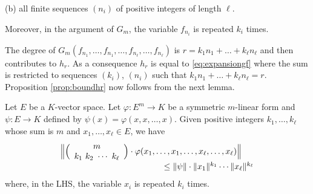 \documentclass{sig-alternate-2013}
\def\binom#1#2{\Big(\begin{array}{cc} #1 \\ #2 \end{array}\Big)}
\begin{document}
\noindent
(b) all finite sequences $(n_i)$ of positive integers of length
$\ell$.

\noindent
Moreover, in the argument of $G_m$, the variable $f_{n_i}$ 
is repeated $k_i$ times.

The degree of $G_m(f_{n_1}, \ldots, f_{n_1}, \ldots, f_{n_\ell},
\ldots, f_{n_\ell})$ is $r = k_1 n_1 + \ldots + k_\ell n_\ell$ and 
then contributes to $h_r$. As a consequence $h_r$ is equal to 
\eqref{eq:expansiongf} where the sum is restricted to sequences
$(k_i)$, $(n_i)$ such that $k_1 n_1 + \ldots + k_\ell n_\ell = r$.
Proposition \ref{prop:boundhr} now follows from the next lemma.

\begin{lem}
Let $E$ be a $K$-vector space. Let $\varphi : E^m \to 
K$ be a symmetric $m$-linear form and $\psi: E \to K$ defined by 
$\psi(x) = \varphi(x, x, \ldots, x)$.
Given positive integers $k_1, \ldots, k_\ell$ whose sum is $m$ and 
$x_1, \ldots, x_\ell \in E$, we have
$$\begin{array}{l}
\Big\Vert \binom m {k_1 \,\, k_2 \,\, \cdots \,\, k_\ell} \cdot
\varphi(x_1, \ldots, x_1, \ldots, x_\ell, \ldots,
x_\ell) \Big\Vert  \\
\hspace{4.3cm} \leq \Vert \psi \Vert \cdot \Vert x_1 \Vert^{k_1} \cdots
 \Vert x_\ell \Vert^{k_\ell}
\end{array}$$
where, in the LHS, the variable $x_i$ is repeated $k_i$ times.
\end{lem}
\end{document}
